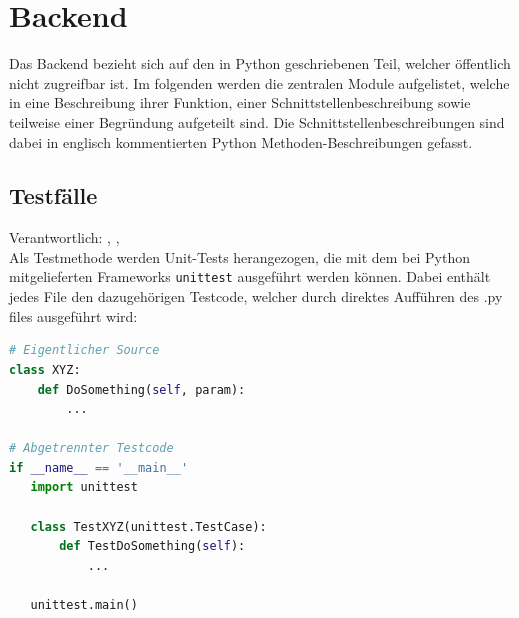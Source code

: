 \chapter{Backend}
\label{cha:backend}
Das Backend bezieht sich auf den in Python geschriebenen Teil, welcher
öffentlich nicht zugreifbar ist.
Im folgenden werden die zentralen Module aufgelistet, welche in eine
Beschreibung ihrer Funktion, einer Schnittstellenbeschreibung sowie
teilweise einer Begründung aufgeteilt sind.
Die Schnittstellenbeschreibungen sind dabei in englisch kommentierten Python Methoden-Beschreibungen gefasst. 

\section{Testfälle}
Verantwortlich: \flo, \ciii, \ci
    \\
Als Testmethode werden Unit-Tests herangezogen, die mit dem bei Python mitgelieferten Frameworks \texttt{unittest}
ausgeführt werden können. Dabei enthält jedes File den dazugehörigen Testcode, welcher durch direktes Aufführen des
.py files ausgeführt wird:

\begin{lstlisting}[language=Python]
# Eigentlicher Source
class XYZ:
    def DoSomething(self, param):
        ...

# Abgetrennter Testcode
if __name__ == '__main__'
   import unittest

   class TestXYZ(unittest.TestCase):
       def TestDoSomething(self):
           ...

   unittest.main()
\end{lstlisting}

\newpage
